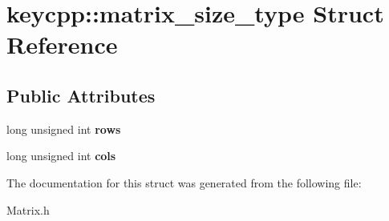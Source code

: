 \hypertarget{structkeycpp_1_1matrix__size__type}{\section{keycpp\-:\-:matrix\-\_\-size\-\_\-type Struct Reference}
\label{structkeycpp_1_1matrix__size__type}
}
\subsection*{Public Attributes}
\begin{DoxyCompactItemize}
\item 
\hypertarget{structkeycpp_1_1matrix__size__type_a1f4893efb4e5b2da85019e0895a06d0c}{long unsigned int {\bfseries rows}}\label{structkeycpp_1_1matrix__size__type_a1f4893efb4e5b2da85019e0895a06d0c}

\item 
\hypertarget{structkeycpp_1_1matrix__size__type_a767a412ec6534bed823157ac5a62ec21}{long unsigned int {\bfseries cols}}\label{structkeycpp_1_1matrix__size__type_a767a412ec6534bed823157ac5a62ec21}

\end{DoxyCompactItemize}


The documentation for this struct was generated from the following file\-:\begin{DoxyCompactItemize}
\item 
Matrix.\-h\end{DoxyCompactItemize}

